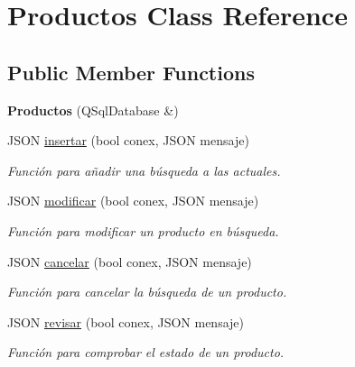 \hypertarget{classProductos}{}\section{Productos Class Reference}
\label{classProductos}
\subsection*{Public Member Functions}
\begin{DoxyCompactItemize}
\item 
\mbox{\label{classProductos_ad4fe67ba871413530dfac21b7bc6fc4b}} 
{\bfseries Productos} (Q\+Sql\+Database \&)
\item 
J\+S\+ON \mbox{\hyperlink{classProductos_acaabd57ce0ce71a2126ce49b11eb8ae1}{insertar}} (bool conex, J\+S\+ON mensaje)
\begin{DoxyCompactList}\small\item\em Función para añadir una búsqueda a las actuales. \end{DoxyCompactList}\item 
J\+S\+ON \mbox{\hyperlink{classProductos_a2c74f34bcdc389ffe8b5413f21e21db5}{modificar}} (bool conex, J\+S\+ON mensaje)
\begin{DoxyCompactList}\small\item\em Función para modificar un producto en búsqueda. \end{DoxyCompactList}\item 
J\+S\+ON \mbox{\hyperlink{classProductos_a96ba61331dee6f46aa751df1e67c91a5}{cancelar}} (bool conex, J\+S\+ON mensaje)
\begin{DoxyCompactList}\small\item\em Función para cancelar la búsqueda de un producto. \end{DoxyCompactList}\item 
J\+S\+ON \mbox{\hyperlink{classProductos_aab417da8db29ade463c7c5102e273d16}{revisar}} (bool conex, J\+S\+ON mensaje)
\begin{DoxyCompactList}\small\item\em Función para comprobar el estado de un producto. \end{DoxyCompactList}\end{DoxyCompactItemize}
